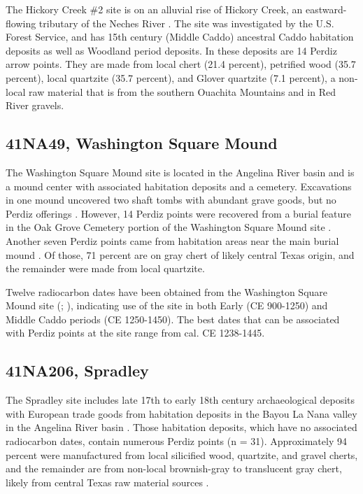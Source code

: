 \documentclass[review]{elsarticle}
\begin{document}
The Hickory Creek \#2 site is on an alluvial rise of Hickory Creek, an eastward-flowing tributary of the Neches River \citep{RN2347}. The site was investigated by the U.S. Forest Service, and has 15th century (Middle Caddo) ancestral Caddo habitation deposits as well as Woodland period deposits. In these deposits are 14 Perdiz arrow points. They are made from local chert (21.4 percent), petrified wood (35.7 percent), local quartzite (35.7 percent), and Glover quartzite (7.1 percent), a non-local raw material that is from the southern Ouachita Mountains and in Red River gravels.

\subsection*{41NA49, Washington Square Mound}

The Washington Square Mound site is located in the Angelina River basin and is a mound center with associated habitation deposits and a cemetery. Excavations in one mound uncovered two shaft tombs with abundant grave goods, but no Perdiz offerings \citep{RN914,RN12}. However, 14 Perdiz points were recovered from a burial feature in the Oak Grove Cemetery portion of the Washington Square Mound site \citep[Figure 77]{RN12}. Another seven Perdiz points came from habitation areas near the main burial mound \citep[Table 14]{RN8963}. Of those, 71 percent are on gray chert of likely central Texas origin, and the remainder were made from local quartzite.

Twelve radiocarbon dates have been obtained from the Washington Square Mound site (\citealp[Table 4]{RN914}; \citealp{RN2944}), indicating use of the site in both Early (CE 900-1250) and Middle Caddo periods (CE 1250-1450). The best dates that can be associated with Perdiz points at the site range from cal. CE 1238-1445.

\subsection*{41NA206, Spradley}

The Spradley site includes late 17th to early 18th century archaeological deposits with European trade goods from habitation deposits in the Bayou La Nana valley in the Angelina River basin \citep{RN8965}. Those habitation deposits, which have no associated radiocarbon dates, contain numerous Perdiz points (n = 31). Approximately 94 percent were manufactured from local silicified wood, quartzite, and gravel cherts, and the remainder are from non-local brownish-gray to translucent gray chert, likely from central Texas raw material sources \citep[Table 7]{RN8965}.
\end{document}
